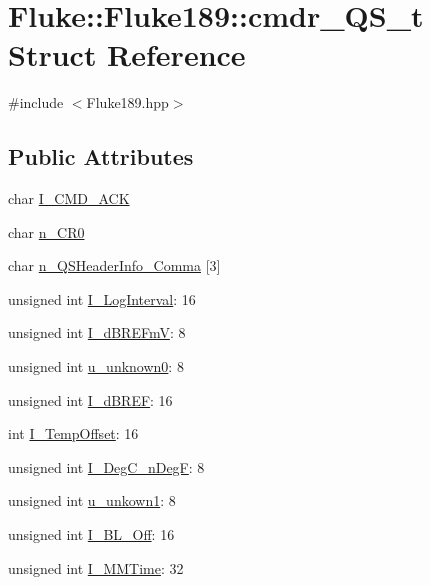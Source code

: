 \hypertarget{structFluke_1_1Fluke189_1_1cmdr__QS__t}{
\section{Fluke::Fluke189::cmdr\_\-QS\_\-t Struct Reference}
\label{structFluke_1_1Fluke189_1_1cmdr__QS__t}
}


{\ttfamily \#include $<$Fluke189.hpp$>$}\subsection*{Public Attributes}
\begin{DoxyCompactItemize}
\item 
char \hyperlink{structFluke_1_1Fluke189_1_1cmdr__QS__t_af806a40dd2e31a0cddaca3cfcf2614ce}{I\_\-CMD\_\-ACK}
\item 
char \hyperlink{structFluke_1_1Fluke189_1_1cmdr__QS__t_ac75ebbfd5c0fca3ed9debbf46fc71b61}{n\_\-CR0}
\item 
char \hyperlink{structFluke_1_1Fluke189_1_1cmdr__QS__t_af2e192902c6c5598c38ebd1c33b3efd4}{n\_\-QSHeaderInfo\_\-Comma} \mbox{[}3\mbox{]}
\item 
unsigned int \hyperlink{structFluke_1_1Fluke189_1_1cmdr__QS__t_ae0893bb5a4c488e9d2acf79f87dba272}{I\_\-LogInterval}: 16
\item 
unsigned int \hyperlink{structFluke_1_1Fluke189_1_1cmdr__QS__t_a89c8364bd224da97ba1611dc031cdb17}{I\_\-dBREFmV}: 8
\item 
unsigned int \hyperlink{structFluke_1_1Fluke189_1_1cmdr__QS__t_a944537557b063c776a16a12218d7e8f8}{u\_\-unknown0}: 8
\item 
unsigned int \hyperlink{structFluke_1_1Fluke189_1_1cmdr__QS__t_a1fef762e7d744e9b1a5be9d8adfbb201}{I\_\-dBREF}: 16
\item 
int \hyperlink{structFluke_1_1Fluke189_1_1cmdr__QS__t_a3ae4f44738b591f2dc068793861f2ea3}{I\_\-TempOffset}: 16
\item 
unsigned int \hyperlink{structFluke_1_1Fluke189_1_1cmdr__QS__t_a7367ebde9a073bee60d85dd03e24297c}{I\_\-DegC\_\-nDegF}: 8
\item 
unsigned int \hyperlink{structFluke_1_1Fluke189_1_1cmdr__QS__t_a5a7897b4c26236a65ffc6d008b19ce67}{u\_\-unkown1}: 8
\item 
unsigned int \hyperlink{structFluke_1_1Fluke189_1_1cmdr__QS__t_ab656118e2f6c46988422d5842277c0d7}{I\_\-BL\_\-Off}: 16
\item 
unsigned int \hyperlink{structFluke_1_1Fluke189_1_1cmdr__QS__t_aa9bdf12e3d59fe96b131f0decc669807}{I\_\-MMTime}: 32

\end{DoxyCompactItemize}
